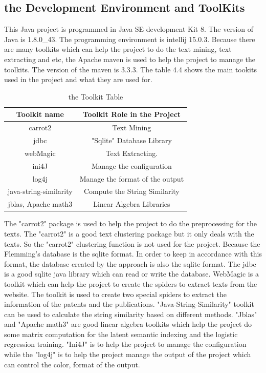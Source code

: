 \subsection{the Development Environment and ToolKits}
This Java project is programmed in Java SE development Kit 8. The version of Java is 1.8.0\_43. The programming environment is intellij 15.0.3. Because there are many toolkits which can help the project to do the text mining, text extracting and etc, the Apache maven is used to help the project to manage the toolkits. The version of the maven is 3.3.3. The table 4.4 shows the main tookits used in the project and what they are used for.  

\begin{table}[b]
\centering

\begin{tabular}{|c|c|}
\hline
Toolkit name & Toolkit Role in the Project \\
\hline
carrot2 & Text Mining \\
\hline
jdbc  & "Sqlite" Database Library \\ 
\hline
webMagic & Text Extracting.\\
\hline
ini4J& Manage the configuration \\
\hline
log4j & Manage the format of the output \\
\hline
java-string-similarity & Compute the String Similarity \\
\hline
jblas, Apache math3 & Linear Algebra Libraries \\
\hline

\end{tabular}

\caption{the Toolkit Table}
\end{table}

The "carrot2" package is used to help the project to do the preprocessing for the texts. The "carrot2" is a good text clustering package but it only deals with the texts. So the "carrot2" clustering function is not used for the project. Because the Flemming's database is the sqlite format. In order to keep in accordance with this format, the database created by the approach is also  the sqlite format. The jdbc is a good sqlite java library which can read or write the database. WebMagic is a toolkit which can help the project to create the spiders to extract texts from the website. The toolkit is used to create two special spiders to extract the information of the patents and the publications. "Java-String-Similarity" toolkit can be used to calculate the string similarity based on different methods. "Jblas" and "Apache math3" are good linear algebra toolkits which help the project do some matrix computation for the latent semantic indexing and the logistic regression training. "Ini4J" is to help the project to manage the configuration while the "log4j" is to help the project manage the output of the project which can control the color, format of the output. 


